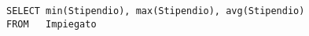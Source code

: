 \begin{lstlisting}
SELECT min(Stipendio), max(Stipendio), avg(Stipendio)
FROM   Impiegato
\end{lstlisting}
